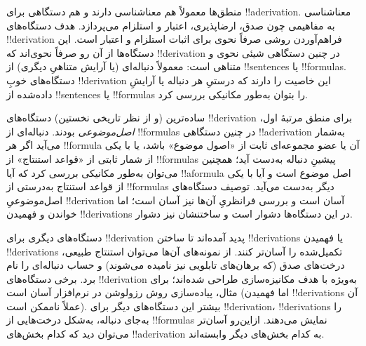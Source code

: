 \documentclass[../../../include/open-logic-section]{subfiles}
\begin{document}
      {}
      {}


منطق‌ها معمولاً هم معناشناسی دارند و هم دستگاهی برای !!a{derivation}.
معناشناسی به مفاهیمی چون صدق، ارضاپذیری، اعتبار و استلزام می‌پردازد.
هدف دستگاه‌های !!{derivation} فراهم‌آوردن روشی صرفاً نحوی برای اثبات
استلزام و اعتبار است. این دستگاه‌ها از آن رو صرفاً نحوی‌اند که
!!{derivation} در چنین دستگاهی شیئی نحوی و متناهی است: معمولاً دنباله‌ای
(یا آرایش متناهیِ دیگری) از !!{sentence}s یا !!{formula}s. دستگاه‌های
خوبِ !!{derivation} این خاصیت را دارند که درستیِ هر دنباله یا آرایشِ
داده‌شده از !!{sentence}s یا !!{formula}s را بتوان به‌طور مکانیکی
بررسی کرد.

ساده‌ترین (و از نظر تاریخی نخستین) دستگاه‌های !!{derivation} برای
منطق مرتبهٔ اول، \emph{اصل‌موضوعی} بودند. دنباله‌ای از !!{formula}s در
چنین دستگاهی !!a{derivation} به‌شمار می‌آید اگر هر !!{formula} آن یا
عضو مجموعه‌ای ثابت از «اصول موضوع» باشد، یا با یکی از شمار ثابتی از
«قواعد استنتاج» از !!{formula}s پیشینِ دنباله به‌دست آید؛ همچنین
می‌توان به‌طور مکانیکی بررسی کرد که آیا !!a{formula} اصل موضوع است و
آیا با یکی از قواعد استنتاج به‌درستی از !!{formula}s دیگر به‌دست
می‌آید. توصیف دستگاه‌های اصل‌موضوعیِ !!{derivation} آسان است و بررسی
فرانظریِ آن‌ها نیز آسان است؛ اما خواندن و فهمیدن !!{derivation}s در
این دستگاه‌ها دشوار است و ساختنشان نیز دشوار.

دستگاه‌های دیگری برای !!{derivation} پدید آمده‌اند تا ساختن
!!{derivation}s یا فهمیدن !!{derivation}s تکمیل‌شده را آسان‌تر کنند.
از نمونه‌های آن‌ها می‌توان استنتاج طبیعی، درخت‌های صدق (که برهان‌های
تابلویی نیز نامیده می‌شوند) و حساب دنباله‌ای را نام برد. برخی
دستگاه‌های !!{derivation} به‌ویژه با هدف مکانیزه‌سازی طراحی شده‌اند؛
برای مثال، پیاده‌سازی روش رزولوشن در نرم‌افزار آسان است (اما فهمیدن
!!{derivation}s آن عملاً ناممکن است). بیشتر این دستگاه‌های دیگر برای
!!{derivation}، !!{derivation}s را به‌جای دنباله، به‌شکل درخت‌هایی از
!!{formula}s
نمایش می‌دهند. ازاین‌رو آسان‌تر می‌توان دید که کدام بخش‌های
!!a{derivation} به کدام بخش‌های دیگر وابسته‌اند.
\end{document}
